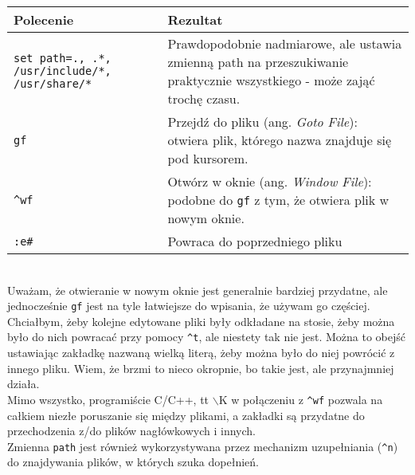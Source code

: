 \documentclass[a4paper,12pt]{article}
\begin{document}
\begin{tabular}{ p{4cm} | p{} }
{\bf Polecenie} & {\bf Rezultat} \\ \hline
{\tt set path=., .*, /usr/include/*, /usr/share/*} & Prawdopodobnie nadmiarowe, ale ustawia zmienną path na przeszukiwanie praktycznie wszystkiego - może zająć trochę czasu. \\
{\tt gf} & Przejdź do pliku (ang. {\it Goto File}): otwiera plik, którego nazwa znajduje się pod kursorem. \\
{\tt \^{}wf} & Otwórz w oknie (ang. {\it Window File}): podobne do {\tt gf} z tym, że otwiera plik w nowym oknie.\\
{\tt :e\#} &	Powraca do poprzedniego pliku\\ \hline
\end{tabular}\\

\noindent
Uważam, że otwieranie w nowym oknie jest generalnie bardziej przydatne, ale jednocześnie {\tt gf} jest na tyle łatwiejsze do wpisania, że używam go częściej. Chciałbym, żeby kolejne edytowane pliki były odkładane na stosie, żeby można było do nich powracać przy pomocy {\tt \^{}t}, ale niestety tak nie jest. Można to obejść ustawiając zakładkę nazwaną wielką literą, żeby można było do niej powrócić z innego pliku. Wiem, że brzmi to nieco okropnie, bo takie jest, ale przynajmniej działa.\\
Mimo wszystko, programiście C/C++, {tt $\backslash$K}  w połączeniu z {\tt \^{}wf} pozwala na całkiem niezłe poruszanie się między plikami, a zakładki są przydatne do przechodzenia z/do plików nagłówkowych i innych.\\
Zmienna {\tt path} jest również wykorzystywana przez mechanizm uzupełniania ({\tt \^{}n}) do znajdywania plików, w których szuka dopełnień.\newpage
\pagestyle{empty}
%
\phantom{Invisible, but important} 
\end{document}
